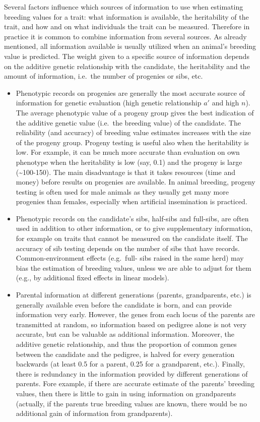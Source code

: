 \documentclass[
]{article}
\begin{document}
Several factors influence which sources of information to use when estimating
breeding values for a trait: what information is available, the heritability of the
trait, and how and on what individuals the trait can be measured. Therefore in practice it is common to combine information from several sources.
As already mentioned, all information available is usually utilized when an animal's breeding value is predicted. The weight given to a specific source of information depends on the additive genetic relationship with the candidate, the heritability and the amount of information, i.e.~the number of progenies or sibs, etc.

\begin{itemize}
\item
  Phenotypic records on progenies are generally the most accurate source
  of information for genetic evaluation (high genetic relationship \(a'\) and high \(n\)). The average phenotypic value of a progeny group gives the best indication of the additive genetic value (i.e.~the breeding value) of the candidate. The reliability (and accuracy) of breeding value estimates increases with the size of the progeny group. Progeny testing is useful also when the heritability is low. For example, it can be much more accurate than evaluation on own phenotype when the heritability is low (say, 0.1) and the progeny is large (\textasciitilde100-150). The main disadvantage is that it takes resources (time and money) before results on progenies are available. In animal breeding, progeny testing is often used for male animals as they usually get many more progenies than females, especially when artificial insemination is practiced.
\item
  Phenotypic records on the candidate's sibs, half-sibs and full-sibs, are often
  used in addition to other information, or to give supplementary information,
  for example on traits that cannot be measured on the candidate itself. The accuracy of sib testing depends on the number of sibs that have records. Common-environment effects (e.g.~full-
  sibs raised in the same herd) may bias the estimation of breeding values, unless we are able to adjust for them (e.g., by additional fixed effects in linear models).
\item
  Parental information at different generations (parents, grandparents, etc.) is generally available even before the candidate is born, and can provide information very early. However,
  the genes from each locus of the parents are transmitted at random, so information
  based on pedigree alone is not very accurate, but can be valuable
  as additional information. Moreover, the additive genetic relationship, and thus the proportion of common genes between the candidate and the pedigree, is halved for every generation backwards (at least 0.5 for a parent, 0.25 for a grandparent, etc.). Finally, there is redundancy in the information provided by different generations of parents. Fore example, if there are accurate estimate of the parents' breeding values, then there is little to gain in using information on grandparents (actually, if the parents true breeding values are known, there would be no additional gain of information from grandparents).
\end{itemize}
\end{document}
